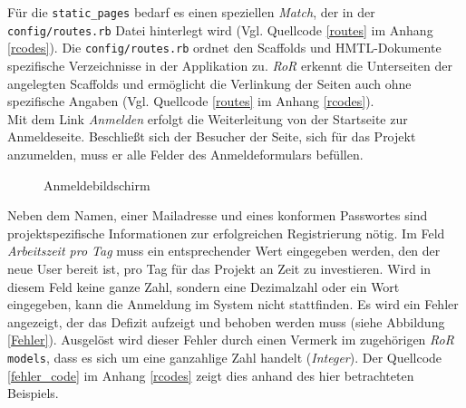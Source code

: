 \documentclass[a4paper,12pt,parskip,bibtotoc,liststotoc]{article}
\begin{document}
Für die \texttt{static\_pages} bedarf es einen speziellen \textit{Match}, der in der \texttt{config/routes.rb} Datei hinterlegt wird (Vgl. Quellcode \ref{routes} im Anhang \ref{rcodes}). Die \texttt{config/routes.rb} ordnet den Scaffolds und HMTL-Dokumente spezifische Verzeichnisse in der Applikation zu. \textit{RoR} erkennt die Unterseiten der angelegten Scaffolds und ermöglicht die Verlinkung der Seiten auch ohne spezifische Angaben (Vgl. Quellcode \ref{routes} im Anhang \ref{rcodes}).\\

Mit dem Link \textit{Anmelden} erfolgt die Weiterleitung von der Startseite zur Anmeldeseite. Beschließt sich der Besucher der Seite, sich für das Projekt anzumelden, muss er alle Felder des Anmeldeformulars befüllen.

\begin{figure}[h!]
  \begin{center}
    \caption{Anmeldebildschirm}  \label{Anm}
  \end{center}
\end{figure}

Neben dem Namen, einer Mailadresse und eines konformen Passwortes sind projektspezifische Informationen zur erfolgreichen Registrierung nötig. Im Feld \textit{Arbeitszeit pro Tag} muss ein entsprechender Wert eingegeben werden, den der neue User bereit ist, pro Tag für das Projekt an Zeit zu investieren. Wird in diesem Feld keine ganze Zahl, sondern eine Dezimalzahl oder ein Wort eingegeben, kann die Anmeldung im System nicht stattfinden. Es wird ein Fehler angezeigt, der das Defizit aufzeigt und behoben werden muss (siehe Abbildung \ref{Fehler}). Ausgelöst wird dieser Fehler durch einen Vermerk im zugehörigen \textit{RoR} \texttt{models}, dass es sich um eine ganzahlige Zahl handelt (\textit{Integer}). Der Quellcode \ref{fehler_code} im Anhang \ref{rcodes} zeigt dies anhand des hier betrachteten Beispiels.\\
\end{document}
